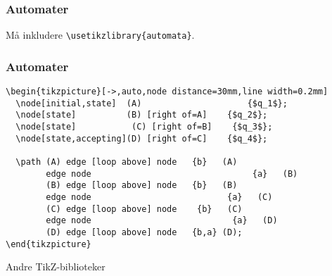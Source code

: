 \documentclass{beamer}
\begin{document}
\begin{frame}[fragile]
\frametitle{Automater}


\begin{center}
\end{center}

Må inkludere \texttt{\textbackslash usetikzlibrary\{automata\}}.

\end{frame}

\begin{frame}[fragile]
\frametitle{Automater}


\begin{Verbatim}[fontsize=\footnotesize, frame=single]
\begin{tikzpicture}[->,auto,node distance=30mm,line width=0.2mm]
  \node[initial,state]  (A) 	          	    {$q_1$};
  \node[state]          (B) [right of=A]    {$q_2$};
  \node[state]	         (C) [right of=B]    {$q_3$};
  \node[state,accepting](D) [right of=C]    {$q_4$};

  \path (A) edge [loop above] node 	 {b}   (A)
	    edge node      			                 {a}   (B)
        (B) edge [loop above] node 	 {b}   (B)
	    edge node   	                    {a}   (C)
        (C) edge [loop above] node	  {b}   (C)
	    edge node 	    	                 {a}   (D)
        (D) edge [loop above] node 	 {b,a} (D);
\end{tikzpicture}
\end{Verbatim}

\end{frame}


\begin{frame}[fragile]
\begin{center}
\Huge{Andre TikZ-biblioteker}
\end{center}
\end{frame}
\end{document}
